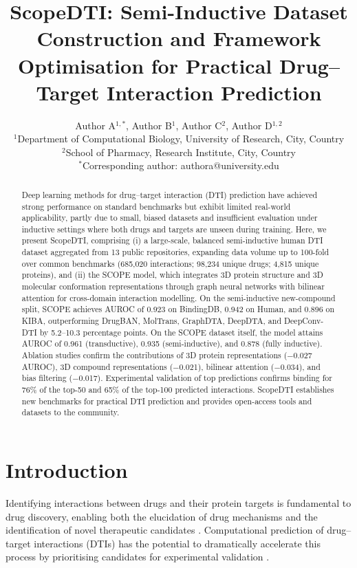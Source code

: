 \documentclass[11pt]{article}
\title{ScopeDTI: Semi-Inductive Dataset Construction and Framework Optimisation for Practical Drug--Target Interaction Prediction}
\author{%
  Author A$^{1,*}$, Author B$^{1}$, Author C$^{2}$, Author D$^{1,2}$ \\[6pt]
  $^{1}$Department of Computational Biology, University of Research, City, Country \\
  $^{2}$School of Pharmacy, Research Institute, City, Country \\
  $^{*}$Corresponding author: authora@university.edu
}
\date{}
\begin{document}
\maketitle

\begin{abstract}
Deep learning methods for drug--target interaction (DTI) prediction have achieved strong performance on standard benchmarks but exhibit limited real-world applicability, partly due to small, biased datasets and insufficient evaluation under inductive settings where both drugs and targets are unseen during training. Here, we present ScopeDTI, comprising (i) a large-scale, balanced semi-inductive human DTI dataset aggregated from 13 public repositories, expanding data volume up to 100-fold over common benchmarks (685,020 interactions; 98,234 unique drugs; 4,815 unique proteins), and (ii) the SCOPE model, which integrates 3D protein structure and 3D molecular conformation representations through graph neural networks with bilinear attention for cross-domain interaction modelling. On the semi-inductive new-compound split, SCOPE achieves AUROC of 0.923 on BindingDB, 0.942 on Human, and 0.896 on KIBA, outperforming DrugBAN, MolTrans, GraphDTA, DeepDTA, and DeepConv-DTI by 5.2--10.3 percentage points. On the SCOPE dataset itself, the model attains AUROC of 0.961 (transductive), 0.935 (semi-inductive), and 0.878 (fully inductive). Ablation studies confirm the contributions of 3D protein representations ($-$0.027 AUROC), 3D compound representations ($-$0.021), bilinear attention ($-$0.034), and bias filtering ($-$0.017). Experimental validation of top predictions confirms binding for 76\% of the top-50 and 65\% of the top-100 predicted interactions. ScopeDTI establishes new benchmarks for practical DTI prediction and provides open-access tools and datasets to the community.
\end{abstract}

\section{Introduction}

Identifying interactions between drugs and their protein targets is fundamental to drug discovery, enabling both the elucidation of drug mechanisms and the identification of novel therapeutic candidates \citep{hopkins2008,santos2017}. Computational prediction of drug--target interactions (DTIs) has the potential to dramatically accelerate this process by prioritising candidates for experimental validation \citep{chen2018,bagherian2021}.
\end{document}
